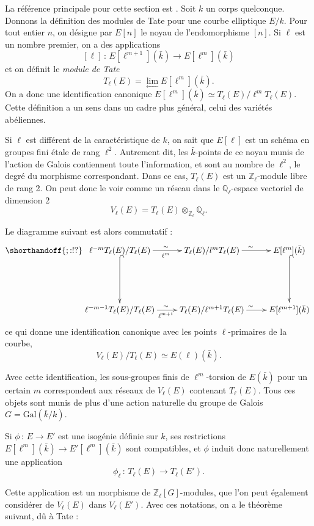 \documentclass[11pt,a4paper]{article}
\newcommand{\Z}{\mathbb{Z}}
\newcommand{\Q}{\mathbb{Q}}
\newcommand{\vers}{\longrightarrow}
\newcommand{\de}{\,:\,}
\renewcommand{\v}{\vspace{5mm}}
\theoremstyle{definition}
\begin{document}
La référence principale pour cette section est \cite{Waterhouse}. Soit $k$ un corps quelconque. Donnons la définition des modules de Tate pour une courbe elliptique $E/k$. Pour tout entier $n$, on désigne par $E[n]$ le noyau de l'endomorphisme $[n]$. Si $\ell$ est un nombre premier, on a des applications
$$ [\ell] \de E[\ell^{m+1}](\bar{k})\vers E[\ell^{m}](\bar{k})$$
et on définit le \emph{module de Tate}
$$T_\ell(E) = \lim_{\leftarrow} E[\ell^m](\bar{k}).$$
On a donc une identification canonique $E[\ell^m](\bar{k})\simeq T_\ell(E)/ \ell^{m} T_\ell(E)$. Cette définition a un sens dans un cadre plus général, celui des variétés abéliennes.
\v

Si $\ell$ est différent de la caractéristique de $k$, on sait que $E[\ell]$ est un schéma en groupes fini étale de rang $\ell^2$. Autrement dit, les $\bar{k}$-points de ce noyau munis de l'action de Galois contiennent toute l'information, et sont au nombre de $\ell^2$, le degré du morphisme correspondant. Dans ce cas, $T_\ell(E)$ est un $\Z_\ell$-module libre de rang 2. On peut donc le voir comme un réseau dans le $\Q_\ell$-espace vectoriel de dimension 2
$$V_\ell(E) = T_\ell(E) \otimes_{\Z_\ell} \Q_\ell.$$

Le diagramme suivant est alors commutatif :
$$
\shorthandoff{;:!?}
\xymatrix {
\ell^{-m} T_\ell(E)/ T_\ell(E) \ar[r]_{\ell^m}^{\sim} \ar@{^{(}->}[dd]&
 T_\ell(E)/ l^m T_\ell(E) \ar[r]^{\sim}  & 
 E[\ell^m](\bar{k}) \ar@{^{(}->}[dd] \\ 
 \\
 \ell^{-m-1} T_\ell(E)/ T_\ell(E) \ar[r]_{\ell^{m+1}}^{\sim} &
 T_\ell(E)/ \ell^{m+1} T_\ell(E) \ar[r]^{\sim}  & 
 E[\ell^{m+1}](\bar{k})
}
$$
ce qui donne une identification canonique avec les points $\ell$-primaires de la courbe,
$$ V_\ell(E)/ T_\ell(E) \simeq E(\ell)(\bar{k}).$$

Avec cette identification, les sous-groupes finis de $\ell^m$-torsion de $E(\bar{k})$ pour un certain $m$ correspondent aux réseaux de $V_\ell(E)$ contenant $T_\ell(E)$. Tous ces objets sont munis de plus d'une action naturelle du groupe de Galois $G= \mathrm{Gal}(\bar{k}/k)$.

Si $\phi\de E\vers E'$ est une isogénie définie sur $k$, ses restrictions $E[\ell^m](\bar{k})\vers E'[\ell^m](\bar{k})$ sont compatibles, et $\phi$ induit donc naturellement une application
$$ \phi_\ell\de T_\ell(E)\vers T_\ell(E').$$

Cette application est un morphisme de $\Z_\ell[G]$-modules, que l'on peut également considérer de $V_\ell(E)$ dans $V_\ell(E')$. Avec ces notations, on a le théorème suivant, dû à Tate :
\end{document}
